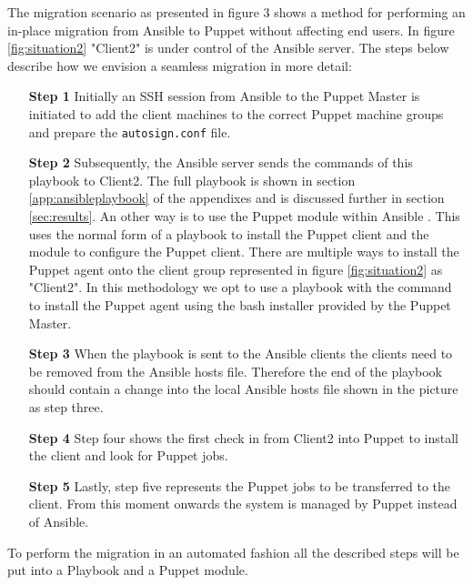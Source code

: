 The migration scenario as presented in figure 3 shows a method for performing an in-place migration from Ansible to Puppet without affecting end users. In figure \ref{fig:situation2} "Client2" is under control of the Ansible server. The steps below describe how we envision a seamless migration in more detail:

\indent
\begin{itemize}
    \item[\bf Step 1] Initially an SSH session from Ansible to the Puppet Master is initiated to add the client machines to the correct Puppet machine groups and prepare the \texttt{autosign.conf} file. 
    
    \item[\bf Step 2] Subsequently, the Ansible server sends the commands of this playbook to Client2. The full playbook is shown in section \ref{app:ansibleplaybook} of the appendixes and is discussed further in section \ref{sec:results}. An other way is to use the Puppet module within Ansible \cite{ansiblepuppet}. This uses the normal form of a playbook to install the Puppet client and the module to configure the Puppet client. There are multiple ways to install the Puppet agent onto the client group represented in figure \ref{fig:situation2} as "Client2". In this methodology we opt to use a playbook with the command to install the Puppet agent using the bash installer provided by the Puppet Master.

    \item[\bf Step 3] When the playbook is sent to the Ansible clients the clients need to be removed from the Ansible hosts file. Therefore the end of the playbook should contain a change into the local Ansible hosts file shown in the picture as step three.

    \item[\bf Step 4] Step four shows the first check in from Client2 into Puppet to install the client and look for Puppet jobs.

    \item[\bf Step 5] Lastly, step five represents the Puppet jobs to be transferred to the client. From this moment onwards the system is managed by Puppet instead of Ansible.

\end{itemize}

To perform the migration in an automated fashion all the described steps will be put into a Playbook and a Puppet module.

